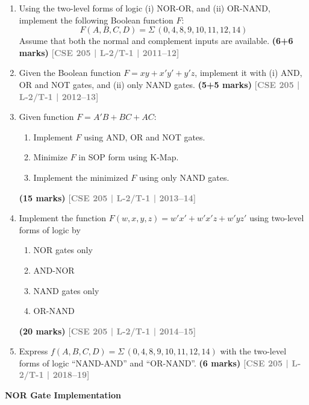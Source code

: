 \documentclass[12pt,a4paper]{article}
\newcommand{\yr}[1]{\hfill\textcolor{gray}{\small\textbf{[#1]}}}
\newcommand{\mk}[1]{\textcolor{orange!70!black}{\small\textbf{(#1 marks)}}}
\newcommand{\subtopic}[2]{%
  \vspace{10pt}
  \noindent\begin{tcolorbox}[colback=#1!8,colframe=#1,boxrule=0.6pt,arc=4pt,
    left=6pt,right=6pt,top=4pt,bottom=4pt]
    \small\bfseries\textcolor{#1}{#2}
  \end{tcolorbox}
  \vspace{2pt}
}
\begin{document}
\begin{enumerate}

\item Using the two-level forms of logic (i) NOR-OR, and (ii) OR-NAND, implement the following Boolean function $F$:
\[ F(A,B,C,D) = \Sigma\,(0,4,8,9,10,11,12,14) \]
Assume that both the normal and complement inputs are available.
\mk{6+6} \yr{CSE 205 | L-2/T-1 | 2011--12}

\item Given the Boolean function $F = xy + x'y' + y'z$, implement it with (i) AND, OR and NOT gates, and (ii) only NAND gates.
\mk{5+5} \yr{CSE 205 | L-2/T-1 | 2012--13}

\item Given function $F = A'B + BC + AC$:
\begin{enumerate}
  \item Implement $F$ using AND, OR and NOT gates.
  \item Minimize $F$ in SOP form using K-Map.
  \item Implement the minimized $F$ using only NAND gates.

\end{enumerate}
\mk{15} \yr{CSE 205 | L-2/T-1 | 2013--14}
\item Implement the function $F(w, x, y, z) = w'x' + w'x'z + w'yz'$ using two-level forms of logic by
\begin{enumerate}
  \item NOR gates only
  \item AND-NOR
  \item NAND gates only
  \item OR-NAND
\end{enumerate}
\mk{20} \yr{CSE 205 | L-2/T-1 | 2014--15}
\item Express $f(A,B,C,D) = \Sigma\,(0,4,8,9,10,11,12,14)$ with the two-level forms of logic ``NAND-AND'' and ``OR-NAND''.
\mk{6} \yr{CSE 205 | L-2/T-1 | 2018--19}



\end{enumerate}



\subtopic{cA}{NOR Gate Implementation}
\label{sub:s1-nor-impl}
\end{document}
